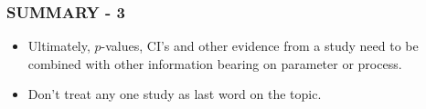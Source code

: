 \documentclass[10pt]{beamer}\usepackage[]{graphicx}\usepackage[]{color}
\begin{document}
\begin{frame}
	\frametitle{SUMMARY - 3}
	\begin{itemize}
		\item
		Ultimately, $p$-values, CI's and other evidence from a study need to be combined with other information bearing on  parameter or process. \newline
		\item
		Don't treat any one study as last word on the topic. \newline
	\end{itemize}
\end{frame}
\end{document}
